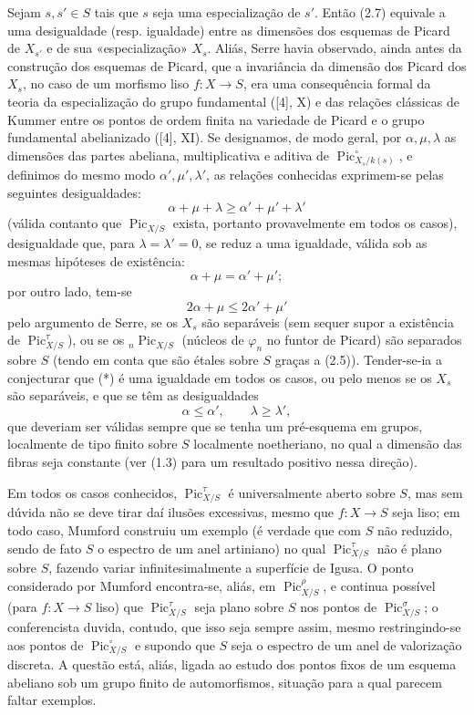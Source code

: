  Sejam $s,s'\in S$ tais que $s$ seja uma especialização
de $s'$. Então (2.7) equivale a uma desigualdade (resp. igualdade) entre as
dimensões dos esquemas de Picard de $X_{s'}$ e de sua «especialização» $X_s$.
Aliás, Serre havia observado, ainda antes da construção dos esquemas de Picard,
que a invariância da dimensão dos Picard dos $X_s$, no caso de um morfismo liso
$f:X\longrightarrow S$, era uma consequência formal da teoria da
especialização do grupo fundamental ([4], X) e das relações clássicas de Kummer
entre os pontos de ordem finita na variedade de Picard e o grupo fundamental
abelianizado ([4], XI). Se designamos, de modo geral, por $\alpha,\mu,\lambda$
as dimensões das partes abeliana, multiplicativa e aditiva de
$\operatorname{Pic}_{X_s/k(s)}^\circ$, e definimos do mesmo modo
$\alpha',\mu',\lambda'$, as relações conhecidas exprimem-se pelas seguintes
desigualdades:
\[
\tag{*}\alpha+\mu+\lambda\geq\alpha'+\mu'+\lambda'
\]
(válida contanto que $\operatorname{Pic}_{X/S}$ exista, portanto provavelmente
em todos os casos), desigualdade que, para $\lambda=\lambda'=0$, se reduz a uma
igualdade, válida sob as mesmas hipóteses de existência:
\[
\alpha+\mu=\alpha'+\mu' ;
\]
por outro lado, tem-se
\[
\tag{**}2\alpha+\mu\leq2\alpha'+\mu'
\]
pelo argumento de Serre, se os $X_s$ são separáveis (sem sequer supor a
existência de $\operatorname{Pic}_{X/S}^\tau$), ou se os
${}_n\operatorname{Pic}_{X/S}$ (núcleos de $\varphi_n$ no funtor de Picard) são
separados sobre $S$ (tendo em conta que são étales sobre $S$ graças a (2.5)).
Tender-se-ia a conjecturar que (*) é uma igualdade em todos os casos, ou pelo
menos se os $X_s$ são separáveis, e que se têm as desigualdades
\[
\tag{***}\alpha\leq\alpha',\qquad\lambda\geq\lambda',
\]
que deveriam ser válidas sempre que se tenha um pré-esquema em grupos,
localmente de tipo finito sobre $S$ localmente noetheriano, no qual a dimensão
das fibras seja constante (ver (1.3) para um resultado positivo nessa direção).

 Em todos os casos conhecidos,
$\operatorname{Pic}_{X/S}^\tau$ é universalmente aberto sobre $S$, mas sem
dúvida não se deve tirar daí ilusões excessivas, mesmo que
$f:X\longrightarrow S$ seja liso; em todo caso, Mumford
construiu um exemplo (é verdade que com $S$ não reduzido, sendo de fato $S$ o
espectro de um anel artiniano) no qual $\operatorname{Pic}_{X/S}^\tau$ não é
plano sobre $S$, fazendo variar infinitesimalmente a superfície de Igusa. O
ponto considerado por Mumford encontra-se, aliás, em
$\operatorname{Pic}_{X/S}^\rho$, e continua possível (para
$f:X\longrightarrow S$ liso) que $\operatorname{Pic}_{X/S}^\tau$ seja plano
sobre $S$ nos pontos de $\operatorname{Pic}_{X/S}^\sigma$; o conferencista
duvida, contudo, que isso seja sempre assim, mesmo restringindo-se aos pontos de
$\operatorname{Pic}_{X/S}^\circ$ e supondo que $S$ seja o espectro de um anel
de valorização discreta. A questão está, aliás, ligada ao estudo dos pontos
fixos de um esquema abeliano sob um grupo finito de automorfismos, situação
para a qual parecem faltar exemplos.


